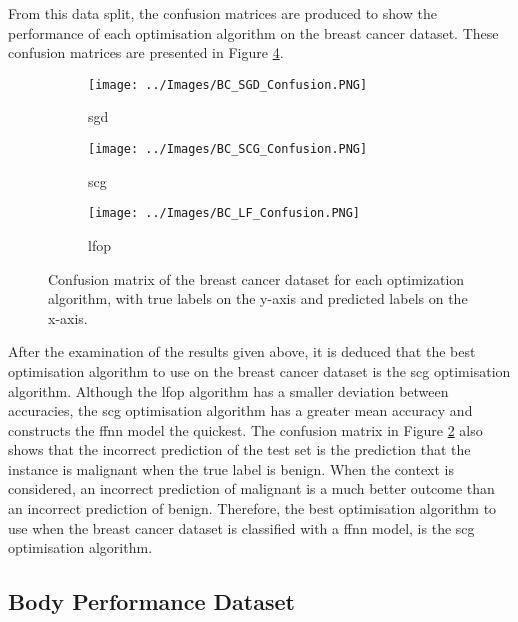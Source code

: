 \documentclass[10pt, conference]{IEEEtran}
\begin{document}
From this data split, the confusion matrices are produced to show the performance of each optimisation
algorithm on the breast cancer dataset. These confusion matrices are presented in Figure \ref{fig:BC_Classification}.
\begin{figure}[H]
    \centering
    \begin{subfigure}[b]{0.23\textwidth}
        \centering
        \texttt{[image: ../Images/BC\_SGD\_Confusion.PNG]}
        \caption{\acrshort{sgd}}
        \label{fig:BC_SGD_Classification}
    \end{subfigure}
    \hfill
    \begin{subfigure}[b]{0.23\textwidth}
        \centering
        \texttt{[image: ../Images/BC\_SCG\_Confusion.PNG]}
        \caption{\acrshort{scg}}
        \label{fig:BC_SCG_Classification}
    \end{subfigure}
    \begin{subfigure}[b]{0.23\textwidth}
        \centering
        \texttt{[image: ../Images/BC\_LF\_Confusion.PNG]}
        \caption{\acrshort{lfop}}
        \label{fig:BC_LF_Classification}
    \end{subfigure}
    \caption{Confusion matrix of the breast cancer dataset for each optimization algorithm, with true labels on the y-axis and predicted labels on the x-axis.}
    \label{fig:BC_Classification}
\end{figure}

After the examination of the results given above, it is deduced that the best optimisation algorithm
to use on the breast cancer dataset is the \acrshort{scg} optimisation algorithm. Although the
\acrshort{lfop} algorithm has a smaller deviation between accuracies, the \acrshort{scg}
optimisation algorithm has a greater mean accuracy and constructs the \acrshort{ffnn} model
the quickest. The confusion matrix in Figure \ref{fig:BC_SCG_Classification} also shows that
the incorrect prediction of the test set is the prediction that the instance is malignant
when the true label is benign. When the context is considered, an incorrect prediction of
malignant is a much better outcome than an incorrect prediction of benign. Therefore, the best
optimisation algorithm to use when the breast cancer dataset is classified with a \acrshort{ffnn}
model, is the \acrshort{scg} optimisation algorithm. 

\subsection{Body Performance Dataset}
\end{document}
